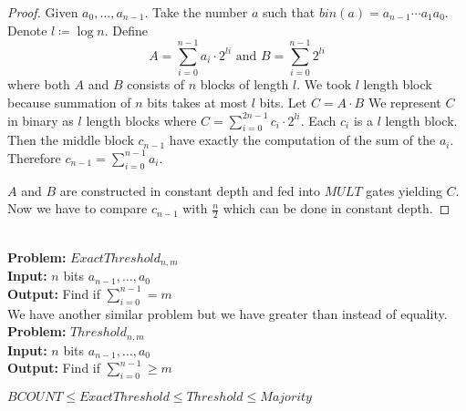\begin{proof}
	Given $a_0,\dots,a_{n-1}$. Take the number $a$ such that $bin(a)=a_{n-1}\cdots a_1a_0$. Denote $l\coloneqq \log n$. Define $$A=\sum_{i=0}^{n-1}a_i\cdot 2^{li}\text{ and }B=\sum_{i=0}^{n-1}2^{li}$$where both $A$ and $B$ consists of $n$ blocks of length $l$. We took $l$ length block because summation of $n$ bits takes at most $l$ bits. Let $C=A\cdot B$ We represent $C$ in binary as $l$ length blocks where  $C=\sum_{i=0}^{2n-1}c_i\cdot 2^{li}$. Each $c_i$ is a $l$ length block. Then the middle block $c_{n-1}$ have exactly the computation of the sum of the $a_i$. Therefore $c_{n-1}=\sum_{i=0}^{n-1}a_i$.
	
	$A$ and $B$ are constructed in constant depth and fed into $MULT$ gates yielding $C$. Now we have to compare $c_{n-1}$ with $\frac{n}{2}$ which can be done in constant depth.
\end{proof}\\
\textbf{Problem:} $ExactThreshold_{n,m}$\\
\textbf{Input:} $n$ bits $a_{n-1},\dots, a_0$\\
\textbf{Output:} Find if $\sum_{i=0}^{n-1}= m$\\[2mm]
We have another similar problem but we have greater than instead of equality.\\[2mm]
\textbf{Problem:} $Threshold_{n,m}$\\
\textbf{Input:} $n$ bits $a_{n-1},\dots, a_0$\\
\textbf{Output:} Find if $\sum_{i=0}^{n-1}\geq m$\\

\begin{theorem}\label{bcthmajrel}
	$BCOUNT\leq ExactThreshold\leq Threshold\leq Majority$
\end{theorem}

